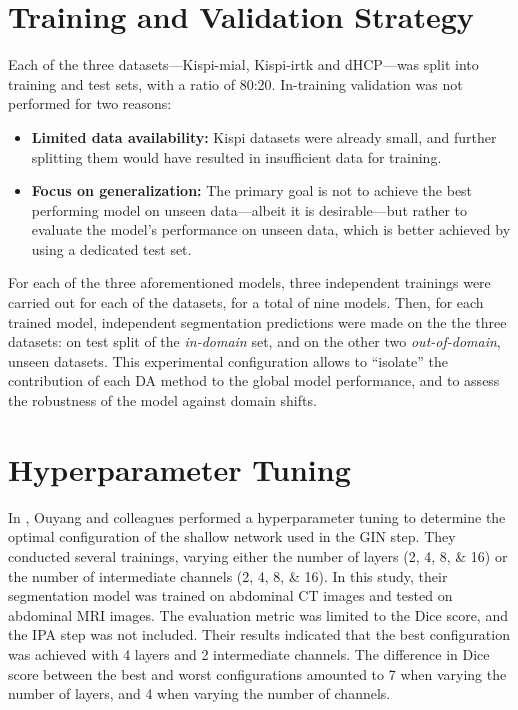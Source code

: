 \section{Training and Validation Strategy} \label{sec:TrainingAndValidationStrategy}
Each of the three datasets---Kispi-mial, Kispi-irtk and dHCP---was split into training and test sets, with a ratio of \num{80}:\num{20}. In-training validation was not performed for two reasons:
\begin{itemize}
    \item \textbf{Limited data availability:} Kispi datasets were already small, and further splitting them would have resulted in insufficient data for training.
    \item \textbf{Focus on generalization:} The primary goal is not to achieve the best performing model on unseen data---albeit it is desirable---but rather to evaluate the model's performance on unseen data, which is better achieved by using a dedicated test set.
\end{itemize}

For each of the three aforementioned models, three independent trainings were carried out for each of the datasets, for a total of nine models. Then, for each trained model, independent segmentation predictions were made on the the three datasets: on test split of the \textit{in-domain} set, and on the other two \textit{out-of-domain}, unseen datasets. This experimental configuration allows to \enquote{isolate} the contribution of each DA method to the global model performance, and to assess the robustness of the model against domain shifts.

\section{Hyperparameter Tuning} \label{sec:HyperparameterTuning}
In \cite{Ouyang2023}, Ouyang and colleagues performed a hyperparameter tuning to determine the optimal configuration of the shallow network used in the GIN step. They conducted several trainings, varying either the number of layers (\numlist[list-final-separator={ or }]{2;4;8;16}) or the number of intermediate channels (\numlist[list-final-separator={ or }]{2;4;8;16}). In this study, their segmentation model was trained on abdominal CT images and tested on abdominal MRI images. The evaluation metric was limited to the Dice score, and the IPA step was not included. Their results indicated that the best configuration was achieved with \num{4} layers and \num{2} intermediate channels. The difference in Dice score between the best and worst configurations amounted to \num{7} when varying the number of layers, and \num{4} when varying the number of channels.

